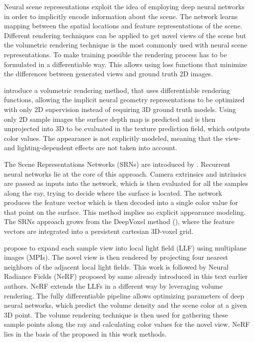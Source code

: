 Neural scene representations exploit the idea of employing
deep neural networks in order to implicitly encode information about the scene.
The network learns mapping between the spatial locations and feature representations of the scene.
Different rendering techniques can be applied to get novel views of the scene
but the volumetric rendering technique is the most commonly used with neural scene representations.
To make training possible the rendering process has to be formulated in a differentiable way.
This allows using loss functions that minimize the differences between generated views and ground truth 2D images.

\cite{niemeyer2020differentiable} introduce a volumetric rendering method,
that uses differentiable rendering functions,
allowing the implicit neural geometry representations to be optimized
with only 2D supervision instead of requiring 3D ground truth models.
Using only 2D sample images the surface depth map is predicted
and is then unprojected into 3D to be evaluated in the texture prediction field,
which outputs color values.
The appearance is not explicitly modeled, meaning that the view- and lighting-dependent effects are not taken into account.


The Scene Representations Networks (SRNs) are introduced by \cite{sitzmann2019srns}.
Recurrent neural networks lie at the core of this approach.
Camera extrinsics and intrinsics are passed as inputs into the network,
which is then evaluated for all the samples along the ray,
trying to decide where the surface is located.
The network produces the feature vector which is then decoded into a single color value for that point on the surface.
This method implies no explicit appearance modeling.
The SRNs approach grows from the DeepVoxel method (\cite{sitzmann2019deepvoxels}),
where the feature vectors are integrated into a persistent cartesian 3D-voxel grid.

\cite{mildenhall2019local} propose to expand each sample view into local light field (LLF) using multiplane images (MPIs).
The novel view is then rendered by projecting four nearest neighbors of the adjacent local light fields.
This work is followed by Neural Radiance Fields (NeRF) \cite{mildenhall2020nerf} proposed by same already introduced in this text earlier authors.
NeRF extends the LLFs in a different way by leveraging volume rendering.
The fully differentiable pipeline allows optimizing parameters of deep neural networks,
which predict the volume density and the scene color at a given 3D point.
The volume rendering technique is then used for gathering these sample points along the ray
and calculating color values for the novel view.
NeRF lies in the basis of the proposed in this work methods.

